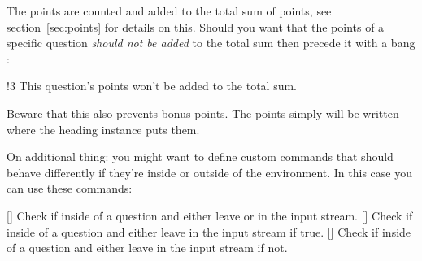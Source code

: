 \documentclass[load-preamble+,scrartcl={DIV10}]{cnltx-doc}
\begin{document}
The points are counted and added to the total sum of points, see
section~\ref{sec:points} for details on this.  Should you
want that the points of a specific question \emph{should not be added} to the
total sum then precede it with a bang \code{!}:
\begin{example}
  \begin{question}{!3}
    This question's points won't be added to the total sum.
  \end{question}
\end{example}
Beware that this also prevents bonus points.  The points simply will be
written where the heading instance puts them.

On additional thing: you might want to define custom
commands that should behave differently if they're inside or outside of the
 environment.  In this case you can use these commands:
\begin{commands}
  \expandable{}[]
    Check if inside of a question and either leave  or
     in the input stream.
  \expandable{}[]
    Check if inside of a question and either leave  in the
    input stream if true.
  \expandable{}[]
    Check if inside of a question and either leave  in the
    input stream if not.
\end{commands}
\end{document}
